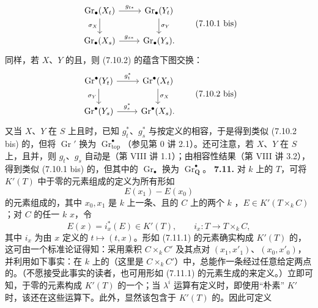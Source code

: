 \[\begin{tikzcd}\operatorname{Gr}_\bullet(X_t)\arrow[r,"g_{t*}"]\arrow[d,"\sigma_X"']&\operatorname{Gr}_\bullet(Y_t)\arrow[d,"\sigma_Y"]\\\operatorname{Gr}_\bullet(X_s)\arrow[r,"g_{s*}"]&\operatorname{Gr}_\bullet(Y_s).\end{tikzcd}\tag{7.10.1 bis}\]
同样，若 $X$、$Y$ 的且，则 (7.10.2) 的蕴含下图交换：
\[\begin{tikzcd}\operatorname{Gr}^{\bullet}(Y_t)\arrow[r,"g_t^*"]\arrow[d,"\sigma_Y"']&\operatorname{Gr}^{\bullet}(X_t)\arrow[d,"\sigma_X"]\\\operatorname{Gr}^{\bullet}(Y_s)\arrow[r,"g_s^*"]&\operatorname{Gr}^{\bullet}(X_s).\end{tikzcd}\tag{7.10.2 bis}\]
又当 $X$、$Y$ 在 $S$ 上且时，已知 $g_t^*$、$g_s^*$ 与按定义的相容，于是得到类似 (7.10.2 bis) 的，但将 $\operatorname{Gr}'$ 换为 $\operatorname{Gr}^{\bullet}_{\mathrm{top}}$（参见第 0 讲 2.1）。还可注意，若 $X$、$Y$ 在 $S$ 上，且并，则 $g_t$、$g_s$ 自动是（第 VIII 讲 1.1）；由相容性结果（第 VIII 讲 3.2），得到类似 (7.10.1 bis) 的，但其中的 $\operatorname{Gr}_\bullet$ 换为 $\operatorname{Gr}^{\bullet}_{\mathbf Q}$。
\textbf{7.11.} 对 $k$ 上的 $T$，可将 $K'(T)$ 中于零的元素组成的定义为所有形如
\[E(x_1)-E(x_0)\tag{7.11.1}\]
的元素组成的，其中 $x_0,x_1$ 是 $k$ 上一条、且的 $C$ 上的两个 $k$ ，$E\in K'(T\times_k C)$；对 $C$ 的任一 $k$  $x$，令
\[E(x)=i_x^*(E)\in K'(T),\qquad i_x:T\longrightarrow T\times_k C,\]
其中 $i_x$ 为由 $x$ 定义的 $t\mapsto(t,x)$。形如 (7.11.1) 的元素确实构成 $K'(T)$ 的，这可由一个标准论证得知：采用乘积 $C\times_k C'$ 及其点对 $(x_1,x'_1)$、$(x_0,x'_0)$，并利用如下事实：在 $k$ 上的（这里是 $C\times_k C'$）中，总能作一条经过任意给定两点的。（不愿接受此事实的读者，也可用形如 (7.11.1) 的元素生成的来定义。）立即可知，于零的元素构成 $K'(T)$ 的一个；当 $\lambda^i$ 运算有定义时，即使用“朴素” $K'$ 时，该还在这些运算下。此外，显然该包含于 $K'(T)$ 的。因此可定义

